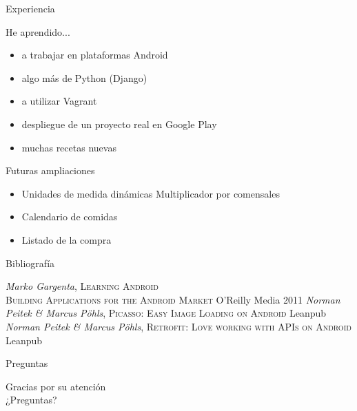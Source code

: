 \documentclass[10pt,xcolor=svgnames]{beamer}
\begin{document}
\begin{frame}{Experiencia}
  \transdissolve

  He aprendido...
  \begin{itemize}
  \item a trabajar en plataformas Android
  \item algo más de Python (Django)
  \item a utilizar Vagrant
  \item despliegue de un proyecto real en Google Play
  \item muchas recetas nuevas
  \end{itemize}
\end{frame}  


\begin{frame}{Futuras ampliaciones}
  \transdissolve

  \begin{itemize}
  \item Unidades de medida dinámicas
    \then{} Multiplicador por comensales

    \vspace*{0.5cm}
  \item Calendario de comidas

    \vspace*{0.5cm}
  \item Listado de la compra
  \end{itemize}
\end{frame}


\begin{frame}{Bibliografía}

  \begin{thebibliography}{4}
   \textit{Marko Gargenta},
    \newblock \textsc{Learning Android\\Building Applications for the Android
      Market} O'Reilly Media 2011
   \textit{Norman Peitek \& Marcus Pöhls},
    \newblock \textsc{Picasso: Easy Image Loading on Android} Leanpub
   \textit{Norman Peitek \& Marcus Pöhls},
    \newblock \textsc{Retrofit: Love working with APIs on Android} Leanpub
  \end{thebibliography}
\end{frame}


\begin{frame}{Preguntas}
  \transdissolve

  \begin{center}
    \Large Gracias por su atención\\
    \vspace*{1cm}
    \Huge \textcolor{naranja}{¿Preguntas?}\\
  \end{center}
\end{frame}  

\licencia
\end{document}
